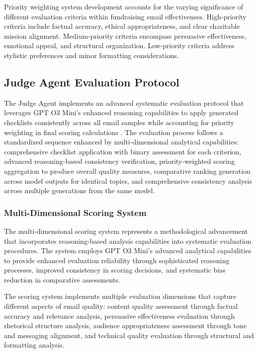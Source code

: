 Priority weighting system development accounts for the varying significance of different evaluation criteria within fundraising email effectiveness. High-priority criteria include factual accuracy, ethical appropriateness, and clear charitable mission alignment. Medium-priority criteria encompass persuasive effectiveness, emotional appeal, and structural organization. Low-priority criteria address stylistic preferences and minor formatting considerations.

\subsection{Judge Agent Evaluation Protocol}

The Judge Agent implements an advanced systematic evaluation protocol that leverages GPT O3 Mini's enhanced reasoning capabilities to apply generated checklists consistently across all email samples while accounting for priority weighting in final scoring calculations \cite{marjanovic2025deepseek_thoughtology, sui2025stop_overthinking}. The evaluation process follows a standardized sequence enhanced by multi-dimensional analytical capabilities: comprehensive checklist application with binary assessment for each criterion, advanced reasoning-based consistency verification, priority-weighted scoring aggregation to produce overall quality measures, comparative ranking generation across model outputs for identical topics, and comprehensive consistency analysis across multiple generations from the same model.

\subsubsection{Multi-Dimensional Scoring System}

The multi-dimensional scoring system represents a methodological advancement that incorporates reasoning-based analysis capabilities into systematic evaluation procedures. The system employs GPT O3 Mini's advanced analytical capabilities to provide enhanced evaluation reliability through sophisticated reasoning processes, improved consistency in scoring decisions, and systematic bias reduction in comparative assessments.

The scoring system implements multiple evaluation dimensions that capture different aspects of email quality: content quality assessment through factual accuracy and relevance analysis, persuasive effectiveness evaluation through rhetorical structure analysis, audience appropriateness assessment through tone and messaging alignment, and technical quality evaluation through structural and formatting analysis.


